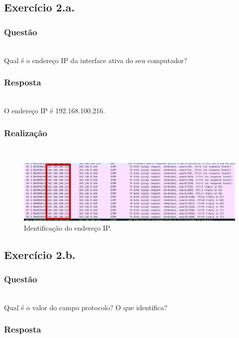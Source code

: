 \documentclass{llncs}
\begin{document}

\subsection{Exercício 2.a.}
\subsubsection{Questão}\rule[-10pt]{0pt}{10pt}\\
Qual é o endereço IP da interface ativa do seu computador?

\subsubsection{Resposta}\rule[-10pt]{0pt}{10pt}\\
O endereço IP é 192.168.100.216. 

\subsubsection{Realização}\rule[-10pt]{0pt}{10pt}\\
\begin{figure}
	\begin{center}
	\includegraphics[scale=0.35]{imagens/ip_source_proof.png} 
	\end{center}
	\caption{\label{fig:ip_source}Identificação do endereço IP.}
\end{figure} 


\subsection{Exercício 2.b.}
\subsubsection{Questão}\rule[-10pt]{0pt}{10pt}\\

Qual é o valor do campo protocolo? O que identifica?

\subsubsection{Resposta}\rule[-10pt]{0pt}{10pt}\\
\end{document}
